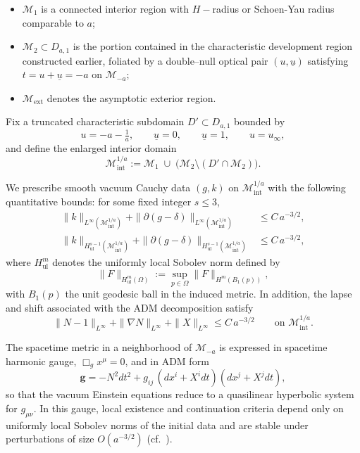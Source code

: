 \documentclass{amsart}
\newcommand{\ubar}{\underline{u}}
\begin{document}
\begin{itemize}
\item $\mathcal M_{1}$ is a connected interior region with $H-$radius or Schoen-Yau radius comparable to $a$;
\item $\mathcal M_{2}\subset D_{a,1}$ is the portion contained in the characteristic development region
constructed earlier, foliated by a double--null optical pair $(u,\ubar)$ satisfying $t=u+\ubar=-a$ on
$\mathcal M_{-a}$;
\item $\mathcal M_{\mathrm{ext}}$ denotes the asymptotic exterior region.
\end{itemize}

\noindent Fix a truncated characteristic subdomain $D'\subset D_{a,1}$ bounded by
\[
u=-a-\tfrac{1}{a},\qquad \ubar=0,\qquad \ubar=1,\qquad u=u_{\infty},
\]
and define the enlarged interior domain
\[
\mathcal M^{1/a}_{\mathrm{int}}
:=
\mathcal M_{1}\;\cup\;\bigl(\mathcal M_{2}\setminus (D'\cap \mathcal M_{2})\bigr).
\]

\medskip

\noindent We prescribe smooth vacuum Cauchy data $(g,k)$ on $\mathcal M^{1/a}_{\mathrm{int}}$ with the following quantitative bounds: for some fixed integer $s\le 3$,
\begin{align}
\label{eq:int-small-Linf}
\|k\|_{L^\infty(\mathcal M^{1/a}_{\mathrm{int}})}
+
\|\partial(g-\delta)\|_{L^\infty(\mathcal M^{1/a}_{\mathrm{int}})}
&\le C\,a^{-3/2},\\
\label{eq:int-small-ul}
\|k\|_{H^{s-1}_{\mathrm{ul}}(\mathcal M^{1/a}_{\mathrm{int}})}
+
\|\partial(g-\delta)\|_{H^{s-1}_{\mathrm{ul}}(\mathcal M^{1/a}_{\mathrm{int}})}
&\le C\,a^{-3/2},
\end{align}
where $H^{m}_{\mathrm{ul}}$ denotes the uniformly local Sobolev norm defined by
\[
\|F\|_{H^{m}_{\mathrm{ul}}(\Omega)}
:=
\sup_{p\in\Omega}\|F\|_{H^{m}(B_{1}(p))},
\]
with $B_{1}(p)$ the unit geodesic ball in the induced metric. In addition, the lapse and shift associated with
the ADM decomposition satisfy
\begin{equation}
\label{eq:int-lapse-shift}
\|N-1\|_{L^\infty}
+
\|\nabla N\|_{L^\infty}
+
\|X\|_{L^\infty}
\le C\,a^{-3/2}
\qquad \text{on } \mathcal M^{1/a}_{\mathrm{int}}.
\end{equation}

\medskip

\noindent The spacetime metric in a neighborhood of $\mathcal M_{-a}$ is expressed in spacetime harmonic gauge,
$\Box_{g}x^{\mu}=0$, and in ADM form
\[
\mathbf g
=
- N^{2}dt^{2}
+
g_{ij}\,(dx^{i}+X^{i}dt)(dx^{j}+X^{j}dt),
\]
so that the vacuum Einstein equations reduce to a quasilinear hyperbolic system for $g_{\mu\nu}$. In this gauge,
local existence and continuation criteria depend only on uniformly local Sobolev norms of the initial data and are
stable under perturbations of size $O(a^{-3/2})$ (cf.\ \cite{lindblad}).
\end{document}
